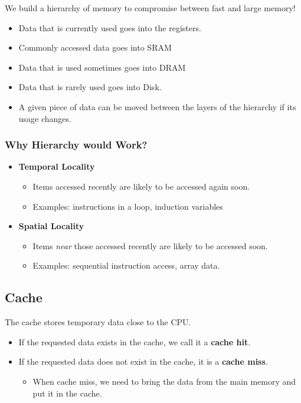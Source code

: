 \documentclass[10pt]{article}
\begin{document}
We build a hierarchy of memory to compromise between fast and large memory!
\begin{itemize}
    \item Data that is currently used goes into the registers.
    \item Commonly accessed data goes into SRAM
    \item Data that is used sometimes goes into DRAM
    \item Data that is rarely used goes into Disk.
    \item A given piece of data can be moved between the layers of the hierarchy if its usage changes.
\end{itemize}
\subsubsection*{Why Hierarchy would Work?}
\begin{itemize}
    \item \textbf{Temporal Locality}
    \begin{itemize}
        \item Items accessed recently are likely to be accessed again soon.
        \item Examples: instructions in a loop, induction variables
    \end{itemize}
    \item \textbf{Spatial Locality}
    \begin{itemize}
        \item Items \textit{near} those accessed recently are likely to be accessed soon.
        \item Examples: sequential instruction access, array data.
    \end{itemize}
\end{itemize}
\subsection*{Cache}
The cache stores temporary data close to the CPU.
\begin{itemize}
    \item If the requested data exists in the cache, we call it a \textbf{cache hit}.
    \item If the requested data does not exist in the cache, it is a \textbf{cache miss}.
    \begin{itemize}
        \item When cache miss, we need to bring the data from the main memory and put it in the cache.
    \end{itemize}
\end{itemize}
\end{document}
